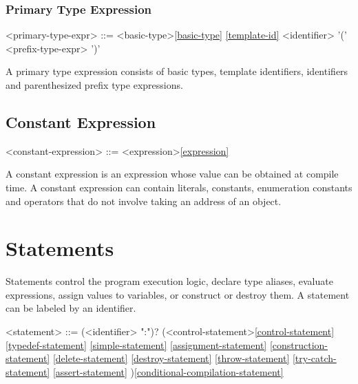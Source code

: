 \documentclass[a4paper,oneside,11pt]{article}
\begin{document}
\subsubsection{Primary Type Expression}

\begin{grammar}
<primary-type-expr> ::= <basic-type>\ref{basic-type}
\ref{template-id}
\alt <identifier>
\alt '(' <prefix-type-expr> ')'
\end{grammar}

A primary type expression consists of basic types, template identifiers, identifiers and parenthesized
prefix type expressions.

\subsection{Constant Expression}

\begin{grammar}
\label{constant-expression}<constant-expression> ::= <expression>\ref{expression}
\end{grammar}

A constant expression is an expression whose value can be obtained at compile time.
A constant expression can contain literals, constants, enumeration constants and operators that
do not involve taking an address of an object.

\section{Statements}

Statements control the program execution logic, declare type aliases, evaluate expressions,
assign values to variables, or construct or destroy them.
A statement can be labeled by an identifier.

\begin{grammar}
\label{statement}<statement> ::= (<identifier> ":")? (<control-statement>\ref{control-statement}
\ref{typedef-statement}
\ref{simple-statement}
\ref{assignment-statement}
\ref{construction-statement}
\ref{delete-statement}
\ref{destroy-statement}
\ref{throw-statement}
\ref{try-catch-statement}
\ref{assert-statement}
)\ref{conditional-compilation-statement}
\end{grammar}
\end{document}
